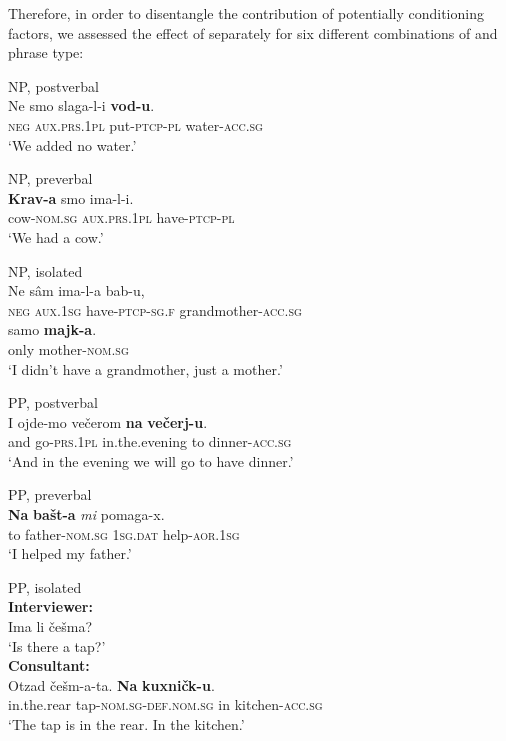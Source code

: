 \documentclass[output=paper,colorlinks,citecolor=brown]{langscibook}
\begin{document}
Therefore, in order to disentangle the contribution of potentially conditioning factors, we assessed the effect of  separately for six different combinations of  and phrase type:

\begin{exe}
	\ex
	\begin{xlist}
		\ex \label{05ex21a} NP, postverbal \\
		\gll Ne smo slaga-l-i \textbf{vod-u}. \\
		\textsc{neg} \textsc{aux.prs.1pl} put-\textsc{ptcp-pl} water-\textsc{acc.sg} \\
		\trans ‘We added no water.’
		
		\ex \label{05ex21b} NP, preverbal \\
		\gll \textbf{Krav-a} smo ima-l-i. \\
		cow-\textsc{nom.sg} \textsc{aux.prs.1pl} have-\textsc{ptcp-pl} \\
		\trans ‘We had a cow.’
		
		\ex \label{05ex21c} NP, isolated \\
		\gll Ne sâm ima-l-a bab-u, \\
		\textsc{neg} \textsc{aux.1sg} have-\textsc{ptcp-sg.f} grandmother-\textsc{acc.sg} \\
		\gll samo \textbf{majk-a}. \\
		only mother-\textsc{nom.sg} \\
		\trans ‘I didn’t have a grandmother, just a mother.’
		
		\ex \label{05ex21d} PP, postverbal \\
		\gll I ojde-mo večerom \textbf{na} \textbf{večerj-u}. \\
		and go-\textsc{prs.1pl} in.the.evening to dinner-\textsc{acc.sg} \\
		\trans ‘And in the evening we will go to have dinner.’
		
		\largerpage[-1.5]

		\ex \label{05ex21e} PP, preverbal \\
		\gll \textbf{Na} \textbf{bašt-a} \emph{mi} pomaga-x. \\
		to father-\textsc{nom.sg} \textsc{1sg.dat} help-\textsc{aor.1sg} \\
		\trans ‘I helped my father.’
		
		\ex \label{05ex21f} PP, isolated \\
		\textbf{Interviewer:} 
		\\ Ima li češma? \\
		\trans ‘Is there a tap?’ \\
		\textbf{Consultant:} \\
		\gll Otzad češm-a-ta. \textbf{Na} \textbf{kuxničk-u}. \\
		in.the.rear tap-\textsc{nom.sg-def.nom.sg} in kitchen-\textsc{acc.sg} \\
		\trans ‘The tap is in the rear. In the kitchen.’
	\end{xlist}
\end{exe}
\end{document}
